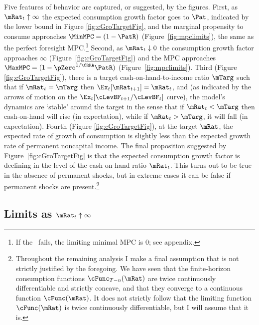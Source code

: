 \documentclass[BufferStockTheory]{subfiles}
\begin{document}
Five features of behavior are captured, or suggested, by the
figures. First, as $\mRat_{t} \uparrow \infty$ the expected
consumption growth factor goes to ${\Pat}$, indicated by the lower
bound in Figure \ref{fig:cGroTargetFig}, and the marginal propensity
to consume approaches $\MinMPC=(1-\PatR)$
(Figure~\ref{fig:mpclimits}), the same as the perfect foresight MPC.\footnote{If the \RIC~fails, the limiting minimal MPC is 0; see appendix.}  Second, as $\mRat_t \downarrow 0$ the consumption
growth factor approaches $\infty$ (Figure~\ref{fig:cGroTargetFig}) and
the MPC approaches $\MaxMPC=(1-\pZero^{1/\CRRA}\PatR)$ (Figure~\ref{fig:mpclimits}).  Third (Figure
\ref{fig:cGroTargetFig}), there is a target cash-on-hand-to-income
ratio $\mTarg$ such that if $\mRat_t = \mTarg$ then $\Ex_t [
{\mRat}_{t+1}] = \mRat_t$, and (as indicated by the arrows of motion
on the $\Ex_{t}[\cLevBF_{t+1}/\cLevBF_{t}]$ curve), the model's dynamics
are `stable' around the target in the sense that if $\mRat_{t} <
\mTarg$ then cash-on-hand will rise (in expectation), while if
$\mRat_{t} > \mTarg$, it will fall (in expectation).  Fourth (Figure
\ref{fig:cGroTargetFig}), at the target $\mRat$, the expected rate of
growth of consumption is slightly less than the expected growth rate
of permanent noncapital income. The final proposition suggested by
Figure~\ref{fig:cGroTargetFig} is that the expected consumption growth
factor is declining in the level of the cash-on-hand ratio
$\mRat_{t}$.  This turns out to be true in the absence of permanent
shocks, but in extreme cases it can be false if permanent shocks are
present.\footnote{Throughout the remaining analysis I make a final
  assumption that is not strictly justified by the foregoing.  We have
  seen that the finite-horizon consumption functions
  $\cFunc_{T-n}(\mRat)$ are twice continuously differentiable and
  strictly concave, and that they converge to a continuous function
  $\cFunc(\mRat)$.  It does not strictly follow that the limiting
  function $\cFunc(\mRat)$ is twice continuously differentiable, but I
  will assume that it is.}

\renewcommand{\figFile}{cGroTargetFig}
\hypertarget{\figFile}{}


\hypertarget{LimitsAsmtToInfty}{}
\subsection{Limits as $\mRat_t \uparrow \infty$}

\label{subsec:LimitsAsmtToInfty}
\end{document}
